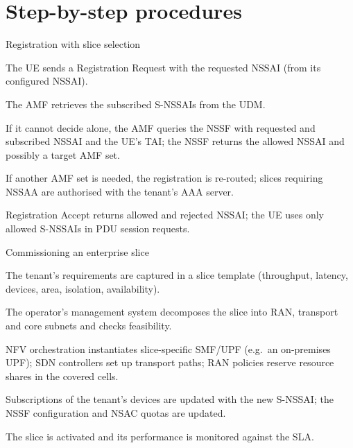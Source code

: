 \documentclass[11pt,a4paper]{article}
\begin{document}
\section{Step-by-step procedures}

\begin{procedurebox}{Registration with slice selection}\label{proc:sel}
\begin{steps}
  \item The UE sends a Registration Request with the requested NSSAI (from its configured NSSAI).
  \item The AMF retrieves the subscribed S-NSSAIs from the UDM.
  \item If it cannot decide alone, the AMF queries the NSSF with requested and subscribed NSSAI and the UE's TAI; the NSSF returns the allowed
        NSSAI and possibly a target AMF set.
  \item If another AMF set is needed, the registration is re-routed; slices requiring NSSAA are authorised with the tenant's AAA server.
  \item Registration Accept returns allowed and rejected NSSAI; the UE uses only allowed S-NSSAIs in PDU session requests.
\end{steps}
\end{procedurebox}

\begin{procedurebox}{Commissioning an enterprise slice}\label{proc:commission}
\begin{steps}
  \item The tenant's requirements are captured in a slice template (throughput, latency, devices, area, isolation, availability).
  \item The operator's management system decomposes the slice into RAN, transport and core subnets and checks feasibility.
  \item NFV orchestration instantiates slice-specific SMF/UPF (e.g.\ an on-premises UPF); SDN controllers set up transport paths; RAN policies
        reserve resource shares in the covered cells.
  \item Subscriptions of the tenant's devices are updated with the new S-NSSAI; the NSSF configuration and NSAC quotas are updated.
  \item The slice is activated and its performance is monitored against the SLA.
\end{steps}
\end{procedurebox}
\end{document}
